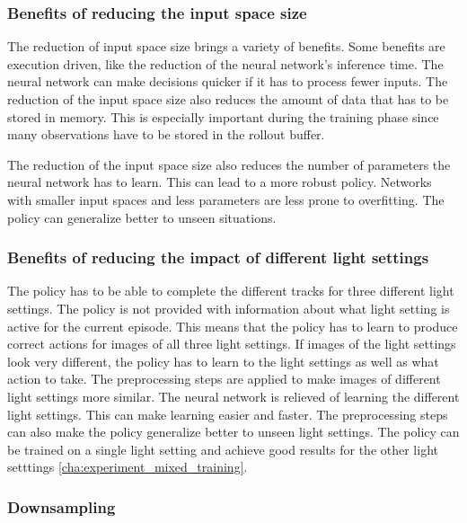 \subsubsection*{Benefits of reducing the input space size}

The reduction of input space size brings a variety of benefits. Some benefits are execution driven, like the reduction of the neural network's inference time. The neural network can make decisions quicker if it has to process fewer inputs. The reduction of the input space size also reduces the amount of data that has to be stored in memory. This is especially important during the training phase since many observations have to be stored in the rollout buffer.

The reduction of the input space size also reduces the number of parameters the neural network has to learn. This can lead to a more robust policy. Networks with smaller input spaces and less parameters are less prone to overfitting. The policy can generalize better to unseen situations. 


\subsubsection*{Benefits of reducing the impact of different light settings}

The policy has to be able to complete the different tracks for three different light settings. The policy is not provided with information about what light setting is active for the current episode. This means that the policy has to learn to produce correct actions for images of all three light settings. If images of the light settings look very different, the policy has to learn to the light settings as well as what action to take. 
The preprocessing steps are applied to make images of different light settings more similar. The neural network is relieved of learning the different light settings. This can make learning easier and faster. 
The preprocessing steps can also make the policy generalize better to unseen light settings. The policy can be trained on a single light setting and achieve good results for the other light setttings \ref{cha:experiment_mixed_training}. 



\subsubsection{Downsampling}

